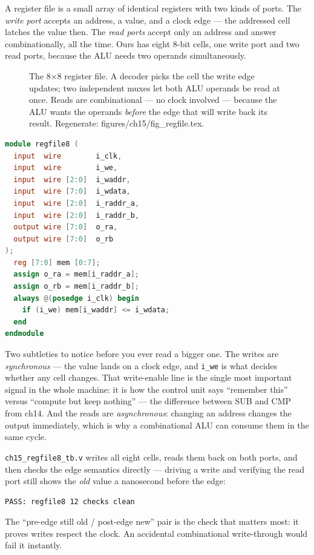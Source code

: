 A register file is a small array of identical registers with two kinds
of ports. The \emph{write port} accepts an address, a value, and a
clock edge --- the addressed cell latches the value then. The
\emph{read ports} accept only an address and answer combinationally,
all the time. Ours has eight 8-bit cells, one write port and two read
ports, because the ALU needs two operands simultaneously.

\begin{figure}[htbp]
\centering

\caption{The 8$\times$8 register file. A decoder picks the cell the
write edge updates; two independent muxes let both ALU operands be
read at once. Reads are combinational --- no clock involved ---
because the ALU wants the operands \emph{before} the edge that will
write back its result. Regenerate: \ttfamily
figures/ch15/fig\_regfile.tex.}
\label{fig:regfile15}
\end{figure}

\begin{lstlisting}[language=Verilog, caption={\ttfamily code/ch15\_regfile8.v
--- one synchronous write port, two asynchronous read ports. The whole
module is twenty lines; the conventions carry the weight.},
label={lst:regfile8}]
module regfile8 (
  input  wire        i_clk,
  input  wire        i_we,
  input  wire [2:0]  i_waddr,
  input  wire [7:0]  i_wdata,
  input  wire [2:0]  i_raddr_a,
  input  wire [2:0]  i_raddr_b,
  output wire [7:0]  o_ra,
  output wire [7:0]  o_rb
);
  reg [7:0] mem [0:7];
  assign o_ra = mem[i_raddr_a];
  assign o_rb = mem[i_raddr_b];
  always @(posedge i_clk) begin
    if (i_we) mem[i_waddr] <= i_wdata;
  end
endmodule
\end{lstlisting}

Two subtleties to notice before you ever read a bigger one.
The writes are \emph{synchronous} --- the value lands on a clock edge,
and \texttt{i\_we} is what decides whether any cell changes. That
write-enable line is the single most important signal in the whole
machine: it is how the control unit says ``remember this'' versus
``compute but keep nothing'' --- the difference between SUB and CMP
from ch14. And the reads are \emph{asynchronous}: changing an address
changes the output immediately, which is why a combinational ALU can
consume them in the same cycle.

\begin{example}
\texttt{ch15\_regfile8\_tb.v} writes all eight cells, reads them back
on both ports, and then checks the edge semantics directly --- driving
a write and verifying the read port still shows the \emph{old} value a
nanosecond before the edge:

\begin{lstlisting}[caption={Real run of \ttfamily ch15\_regfile8\_tb.v.}]
PASS: regfile8 12 checks clean
\end{lstlisting}

The ``pre-edge still old / post-edge new'' pair is the check that
matters most: it proves writes respect the clock. An accidental
combinational write-through would fail it instantly.
\end{example}

